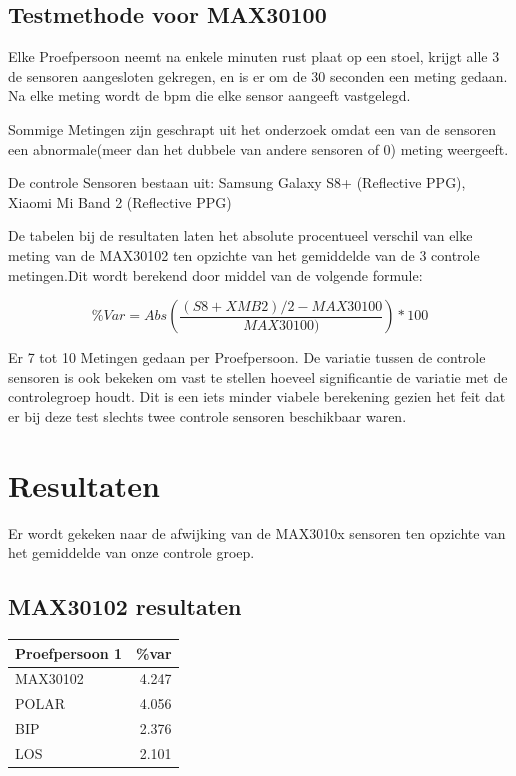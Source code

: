 \documentclass[11pt]{article}
\begin{document}
\subsection{Testmethode voor MAX30100}

Elke Proefpersoon neemt na enkele minuten rust plaat op een stoel, krijgt alle 3 de sensoren aangesloten gekregen, en is er om de 30 seconden een meting gedaan. Na elke meting wordt de bpm die elke sensor aangeeft vastgelegd.

Sommige Metingen zijn geschrapt uit het onderzoek omdat een van de sensoren een abnormale(meer dan het dubbele van andere sensoren of 0) meting weergeeft.

De controle Sensoren bestaan uit: Samsung Galaxy S8+ (Reflective PPG), Xiaomi Mi Band 2 (Reflective PPG)


De tabelen bij de resultaten laten het absolute procentueel verschil van elke meting van de MAX30102 ten opzichte van het gemiddelde van de 3 controle metingen.Dit wordt berekend door middel van de volgende formule:

\[\% Var =Abs(\frac{(S8+XMB2)/2-MAX30100}{MAX30100)})*100 \]

Er 7 tot 10 Metingen gedaan per Proefpersoon. De variatie tussen de controle sensoren is ook bekeken om vast te stellen hoeveel significantie de variatie met de controlegroep houdt. Dit is een iets minder viabele berekening gezien het feit dat er bij deze test slechts twee controle sensoren beschikbaar waren.


    \section{Resultaten}\label{sec:resultaten}
Er wordt gekeken naar de afwijking van de MAX3010x sensoren ten opzichte van het gemiddelde van onze controle groep.


\subsection{MAX30102 resultaten}\label{subsec:max30102 resultaten}

	\begin{table}[H]
	\begin{tabular}{l|r}
\textbf{Proefpersoon 1}  & \%var  \\
	\hline
	MAX30102	& 4.247  \\
	POLAR		& 4.056  \\
	BIP		& 2.376  \\
	LOS		& 2.101  \\
	\end{tabular}
	\end{table}
\end{document}
